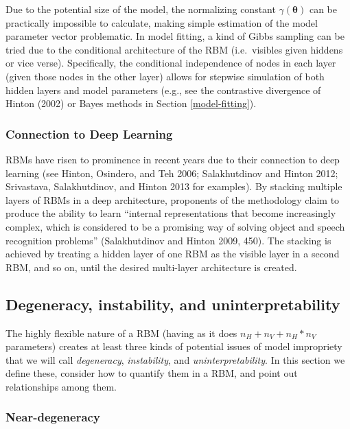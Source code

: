 \documentclass[AMS,STIX1COL]{WileyNJD-v2}
\newcommand{\nv}{{n_{\scriptscriptstyle V}}}
\newcommand{\nh}{{n_{\scriptscriptstyle H}}}
\begin{document}
Due to the potential size of the model, the normalizing constant
\(\gamma(\boldsymbol \theta)\) can be practically impossible to
calculate, making simple estimation of the model parameter vector
problematic. In model fitting, a kind of Gibbs sampling can be tried due
to the conditional architecture of the RBM (i.e.~visibles given hiddens
or vice verse). Specifically, the conditional independence of nodes in
each layer (given those nodes in the other layer) allows for stepwise
simulation of both hidden layers and model parameters (e.g., see the
contrastive divergence of Hinton (2002) or Bayes methods in Section
\ref{model-fitting}).

\hypertarget{connection-to-deep-learning}{%
\subsubsection{Connection to Deep
Learning}\label{connection-to-deep-learning}}

RBMs have risen to prominence in recent years due to their connection to
deep learning (see Hinton, Osindero, and Teh 2006; Salakhutdinov and
Hinton 2012; Srivastava, Salakhutdinov, and Hinton 2013 for examples).
By stacking multiple layers of RBMs in a deep architecture, proponents
of the methodology claim to produce the ability to learn ``internal
representations that become increasingly complex, which is considered to
be a promising way of solving object and speech recognition problems''
(Salakhutdinov and Hinton 2009, 450). The stacking is achieved by
treating a hidden layer of one RBM as the visible layer in a second RBM,
and so on, until the desired multi-layer architecture is created.

\hypertarget{degeneracy-instability-and-uninterpretability}{%
\subsection{Degeneracy, instability, and
uninterpretability}\label{degeneracy-instability-and-uninterpretability}}

The highly flexible nature of a RBM (having as it does
\(\nh + \nv + \nh*\nv\) parameters) creates at least three kinds of
potential issues of model impropriety that we will call
\emph{degeneracy}, \emph{instability}, and \emph{uninterpretability}. In
this section we define these, consider how to quantify them in a RBM,
and point out relationships among them.

\hypertarget{near-degeneracy}{%
\subsubsection{Near-degeneracy}\label{near-degeneracy}}
\end{document}
